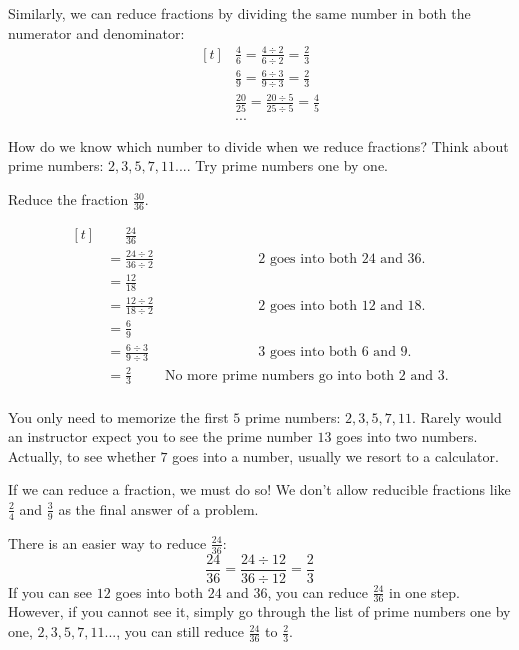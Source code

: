 Similarly, we can reduce fractions by dividing the same number in both the numerator and denominator:
\[
\begin{aligned}[t]
   &\frac{4}{6}=\frac{4\div2}{6\div2}=\frac{2}{3} \\
   &\frac{6}{9}=\frac{6\div3}{9\div3}=\frac{2}{3} \\
   &\frac{20}{25}=\frac{20\div5}{25\div5}=\frac{4}{5} \\
   &...
\end{aligned}
\]

How do we know which number to divide when we reduce fractions? Think about prime numbers: $2,3,5,7,11...$. Try prime numbers one by one.

\begin{myexample}
Reduce the fraction $\frac{30}{36}$.
\end{myexample}
\begin{solution}
\[
\begin{aligned}[t]
   &\phantom{{}=} \frac{24}{36} \\
   &= \frac{24\div2}{36\div2} &\phantom{=====}\text{2 goes into both 24 and 36.} \\
   &= \frac{12}{18} \\
   &= \frac{12\div2}{18\div2} &\phantom{=====}\text{2 goes into both 12 and 18.} \\
   &= \frac{6}{9} \\
   &= \frac{6\div3}{9\div3} &\phantom{=====}\text{3 goes into both 6 and 9.} \\
   &= \frac{2}{3} &\text{No more prime numbers go into both 2 and 3.}\\
\end{aligned}
\]
\end{solution}

You only need to memorize the first $5$ prime numbers: $2,3,5,7,11$. Rarely would an instructor expect you to see the prime number $13$ goes into two numbers. Actually, to see whether $7$ goes into a number, usually we resort to a calculator.

If we can reduce a fraction, we must do so! We don't allow reducible fractions like $\frac{2}{4}$ and $\frac{3}{9}$ as the final answer of a problem. 

There is an easier way to reduce $\frac{24}{36}$:
\[ \frac{24}{36}=\frac{24\div12}{36\div12}=\frac{2}{3} \]
If you can see $12$ goes into both $24$ and $36$, you can reduce $\frac{24}{36}$ in one step. However, if you cannot see it, simply go through the list of prime numbers one by one, $2,3,5,7,11...$, you can still reduce $\frac{24}{36}$ to $\frac{2}{3}$.

